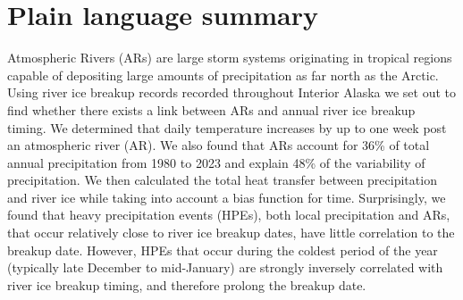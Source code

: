 \documentclass[draft]{AR_analysis_}
\begin{document}
\section*{Plain language summary}

	Atmospheric Rivers (ARs) are large storm systems originating in
	tropical regions capable of depositing large amounts of
	precipitation as far north as the Arctic. 
	Using river ice breakup records recorded throughout Interior
	Alaska we set out to find whether there exists a link between
	ARs and annual river ice breakup timing. We determined that 
	daily temperature increases by up to
	one week post an atmospheric river (AR). We also found that ARs
	account for 36\% of total annual precipitation from 1980 to 2023
	and explain 48\% of the variability of precipitation. We then
	calculated the total heat transfer between precipitation and river
	ice while taking into account a bias function for time.
	Surprisingly, we found that heavy precipitation events (HPEs),
	both local precipitation and ARs, that occur relatively close to
	river ice breakup dates, have little correlation to the breakup
	date. However, HPEs that occur during the coldest period of the
	year (typically late December to mid-January) are strongly inversely
	correlated with river ice breakup timing, and therefore prolong
	the breakup date.

%
%

%

\end{document}
